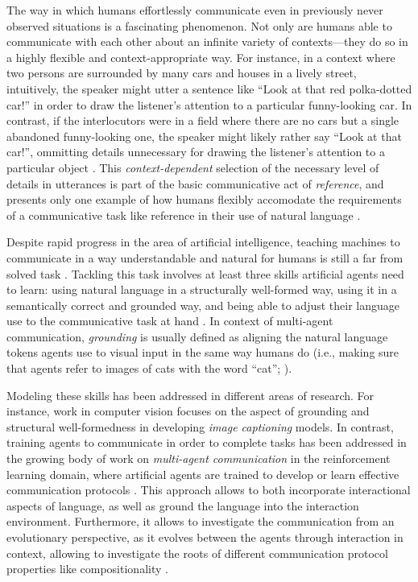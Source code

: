 The way in which humans effortlessly communicate even in previously never observed situations is a fascinating phenomenon. Not only are humans able to communicate with each other about an infinite variety of contexts---they do so in a highly flexible and context-appropriate way. For instance, in a context where two persons are surrounded by many cars and houses in a lively street, intuitively, the speaker might utter a sentence like ``Look at that red polka-dotted car!'' in order to draw the listener's attention to a particular funny-looking car. In contrast, if the interlocutors were in a field where there are no cars but a single abandoned funny-looking one, the speaker might likely rather say ``Look at that car!'', ommitting details unnecessary for drawing the listener's attention to a particular object \parencite[cf.][]{graf2016animal, degen2020redundancy}. This \textit{context-dependent} selection of the necessary level of details in utterances is part of the basic communicative act of \textit{reference}, and presents only one example of how humans flexibly accomodate the requirements of a communicative task like reference in their use of natural language \parencite{searle1969speech, grice1975logic}.

Despite rapid progress in the area of artificial intelligence, teaching machines to communicate in a way understandable and natural for humans is still a far from solved task \parencite{lazaridou2020emergent, lake2017building, lecun2015deep}. Tackling this task involves at least three skills artificial agents need to learn: using natural language in a structurally well-formed way, using it in a semantically correct and grounded way, and being able to adjust their language use to the communicative task at hand \parencite{lazaridou2020emergent}. In context of multi-agent communication, \textit{grounding} is usually defined as aligning the natural language tokens agents use to visual input in the same way humans do (i.e., making sure that agents refer to images of cats with the word ``cat''; \cite{jurafsky2000speech}).

Modeling these skills has been addressed in different areas of research. For instance, work in computer vision focuses on the aspect of grounding and structural well-formedness in developing \textit{image captioning} models.
In contrast, training agents to communicate in order to complete tasks has been addressed in the growing body of work on \textit{multi-agent communication} in the reinforcement learning domain, where artificial agents are trained to develop or learn effective communication protocols \parencite[e.g.,][]{foerster2016learning, lazaridou2020emergent}.
This approach allows to both incorporate interactional aspects of language, as well as ground the language into the interaction environment. Furthermore, it allows to investigate the communication from an evolutionary perspective, as it evolves between the agents through interaction in context, allowing to investigate the roots of different communication protocol properties like compositionality \parencite{lazaridou2020emergent}. 

